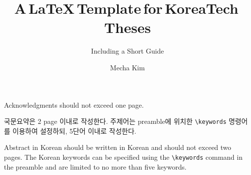 \documentclass[bfive,twoside,eng]{koreatechthesis}
\author{Mecha Kim}			%
\title{A\,\LaTeX\,Template\,for\,KoreaTech\,Theses}		%
\subtitle{Including a Short Guide}						%
\theoremstyle{plain}
\begin{document}

\makefrontmatter




\begin{acknowledgement}
	Acknowledgments should not exceed one page.
\end{acknowledgement}




\hypersetup{pageanchor=true}	%
\pagestyle{plain}				%
\setcounter{page}{1}

\begin{abstractkor}
	국문요약은 2 page 이내로 작성한다.
	주제어는 preamble에 위치한 \verb|\keywords| 명령어를 이용하여 설정하되, 5단어 이내로 작성한다.
	
	Abstract in Korean should be written in Korean and should not exceed two pages.
	The Korean keywords can be specified using the \verb|\keywords| command in the preamble and are limited to no more than five keywords.
\end{abstractkor}
\end{document}
